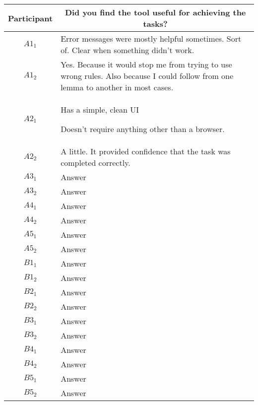 \noindent
\begin{tabularx}{\linewidth}{@{}cX@{}}
  \toprule
  Participant & \multicolumn{1}{c}{
    \textbf{Did you find the tool useful for achieving the tasks?}
  } \\ \midrule
  $A1_{1}$ & Error messages were mostly helpful sometimes. Sort of. Clear when something didn't work. \\
  $A1_{2}$ & Yes.  Because it would stop me from trying to use wrong rules.  Also because I could follow from one lemma to another in most cases. \\
  $A2_{1}$ & \begin{enumerate*} \item Has a simple, clean UI \item Doesn't require anything other than a browser. \end{enumerate*} \\
  $A2_{2}$ & A little.  It provided confidence that the task was completed correctly. \\
  $A3_{1}$ & Answer \\
  $A3_{2}$ & Answer \\
  $A4_{1}$ & Answer \\
  $A4_{2}$ & Answer \\
  $A5_{1}$ & Answer \\
  $A5_{2}$ & Answer \\
  \midrule
  $B1_{1}$ & Answer \\
  $B1_{2}$ & Answer \\
  $B2_{1}$ & Answer \\
  $B2_{2}$ & Answer \\
  $B3_{1}$ & Answer \\
  $B3_{2}$ & Answer \\
  $B4_{1}$ & Answer \\
  $B4_{2}$ & Answer \\
  $B5_{1}$ & Answer \\
  $B5_{2}$ & Answer \\
  \bottomrule
\end{tabularx}{\parfillskip=0pt\par}

